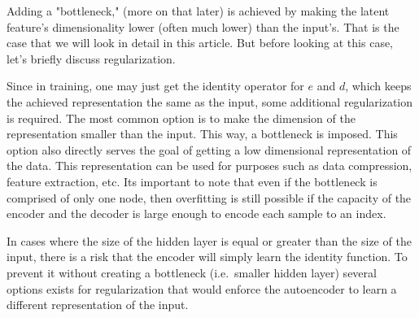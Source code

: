 Adding a "bottleneck," (more on that later) is achieved by making the latent feature's dimensionality lower (often much lower) than the input's. That is the case that we will look in detail in this article. But before looking at this case, let’s briefly discuss regularization.

Since in training, one may just get the identity operator for $e$ and $d$, which keeps the achieved representation the same as the input, some additional regularization is required. The most common option is to make the dimension of the representation smaller than the input. This way, a \alert{bottleneck} is imposed. This option also directly serves the goal of getting a low dimensional representation of the data. This representation can be used for purposes such as data compression, feature extraction, etc. Its important to note that even if the bottleneck is comprised of only one node, then overfitting is still possible if the capacity of the encoder and the decoder is large enough to encode each sample to an index.

In cases where the size of the hidden layer is equal or greater than the size of the input, there is a risk that the encoder will simply learn the identity function. To prevent it without creating a bottleneck (i.e.\, smaller hidden layer) several options exists for regularization that would enforce the autoencoder to learn a different representation of the input.







%